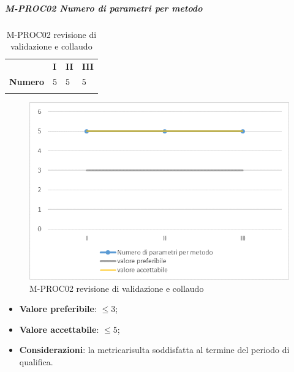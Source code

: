\subparagraph{M-PROC02 Numero di parametri per metodo} \mbox{}
\begin{longtable}[H!] {						
		>{}p{50mm}  		
		>{}p{8mm}
		>{}p{8mm}		
		>{}p{8mm}		
	}
	\rowcolor{gray!50}
	\textbf{} & \textbf{I} & \textbf{II} & \textbf{III} \TBstrut \\ [2mm]
	\textbf{Numero} & 5 & 5 & 5 \TBstrut \\ [2mm]
	\rowcolor{white}
	\caption{M-PROC02 revisione di validazione e collaudo}
\end{longtable}
\begin{figure}[H] 	
	\includegraphics[width=\linewidth]{./img/grafici/RA2.png}	
	\caption{M-PROC02 revisione di validazione e collaudo}	
\end{figure}
\begin{itemize}
	\item \textbf{Valore preferibile}: $\le 3$;
	\item \textbf{Valore accettabile}: $\le 5$;
	\item \textbf{Considerazioni}: la metrica\glosp risulta soddisfatta al termine del periodo di qualifica.
\end{itemize}

